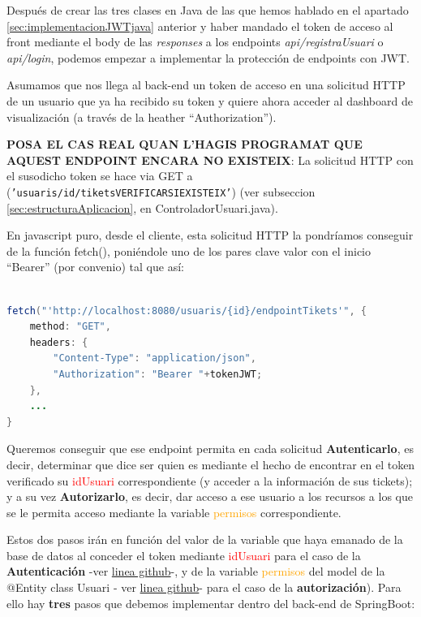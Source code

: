 \documentclass[a4paper,12pt]{report}
\begin{document}
		Después de crear las tres clases en Java de las que hemos hablado en el apartado \ref{sec:implementacionJWTjava} anterior y haber mandado el token de acceso al front mediante el body de las \textit{responses} a los endpoints \textit{api/registraUsuari} o \textit{api/login}, podemos empezar a 
		implementar la protección de endpoints con JWT. 
		
		Asumamos que nos llega al back-end un token de acceso en una solicitud HTTP de un usuario que ya ha recibido su token y quiere ahora acceder al dashboard de visualización (a través de la heather ``Authorization''). 
		
	\textbf{	POSA EL CAS REAL QUAN L'HAGIS PROGRAMAT QUE AQUEST ENDPOINT ENCARA NO EXISTEIX}: La solicitud HTTP con el susodicho token se hace via GET a (\texttt{'usuaris/{id}/tiketsVERIFICARSIEXISTEIX'}) (ver subseccion \ref{sec:estructuraAplicacion}, en ControladorUsuari.java). 
		
		En javascript puro, desde el cliente, esta solicitud HTTP la pondríamos conseguir de la función fetch(), poniéndole uno de los pares clave valor con el inicio ``Bearer'' (por convenio) tal que así:
		
				
\begin{lstlisting}[language=Java, basicstyle=\ttfamily\footnotesize, keywordstyle=\color{magenta}]

fetch("'http://localhost:8080/usuaris/{id}/endpointTikets'", {
	method: "GET",
	headers: {
		"Content-Type": "application/json",
		"Authorization": "Bearer "+tokenJWT;
	},
	...
}
\end{lstlisting}
		
		 Queremos conseguir que ese endpoint permita en cada solicitud \textbf{Autenticarlo}, es decir, determinar que dice ser quien es mediante el hecho de encontrar en el token verificado su \textcolor{red}{idUsuari} correspondiente (y acceder a la información de sus tickets); y a su vez \textbf{Autorizarlo}, es decir, dar acceso a ese usuario a los recursos a los que se le permita acceso mediante la variable \textcolor{orange}{permisos} correspondiente.
		
		 Estos dos pasos irán en función del valor de la variable que haya emanado de la base de datos al conceder el token mediante \textcolor{red}{idUsuari} para el caso de la \textbf{Autenticación} -ver \href{https://github.com/blackcub3s/mercApp/blob/b01cec515bb9af27a1faa24258abb4313ef275cd/APP%20WEB/__springboot__produccio__/app/src/main/java/miApp/app/Usuaris/model/Usuari.java#L30}{linea github}-, y de la variable \textcolor{orange}{permisos} del model de la @Entity class Usuari - ver \href{https://github.com/blackcub3s/mercApp/blob/b01cec515bb9af27a1faa24258abb4313ef275cd/APP%20WEB/__springboot__produccio__/app/src/main/java/miApp/app/Usuaris/model/Usuari.java#L42}{linea github}- para el caso de la \textbf{autorización}). Para ello hay \textbf{tres} pasos que debemos implementar dentro del back-end de SpringBoot:
		
\end{document}
